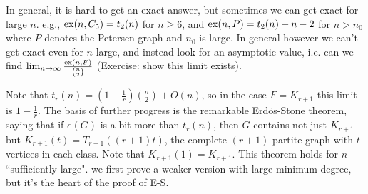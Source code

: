 \documentclass[10pt,a4paper]{article}
\begin{document}
In general, it is hard to get an exact answer, but sometimes we can get exact for large $n$. e.g., $\operatorname{ex}(n,C_5) = t_2(n)$ for $n\geq 6$, and $\operatorname{ex}(n,P) = t_2(n)+n-2$ for $n>n_0$ where $P$ denotes the Petersen graph and $n_0$ is large. In general however we can't get exact even for $n$ large, and instead look for an asymptotic value, i.e. can we find $\lim_{n\to\infty} \frac{\operatorname{ex}(n,F)}{\binom{n}{2}}$ (Exercise: show this limit exists).

Note that $t_r(n) = (1-\frac{1}{r})\binom{n}{2} + O(n)$, so in the case $F=K_{r+1}$ this limit is $1-\frac{1}{r}$. The basis of further progress is the remarkable Erd\"os-Stone theorem, saying that if $e(G)$ is a bit more than $t_r(n)$, then $G$ contains not just $K_{r+1}$ but $K_{r+1}(t) = T_{r+1}((r+1)t)$, the complete $(r+1)$-partite graph with $t$ vertices in each class. Note that $K_{r+1}(1) = K_{r+1}$. This theorem holds for $n$ ``sufficiently large". we first prove a weaker version with large minimum degree, but it's the heart of the proof of E-S.
\end{document}
